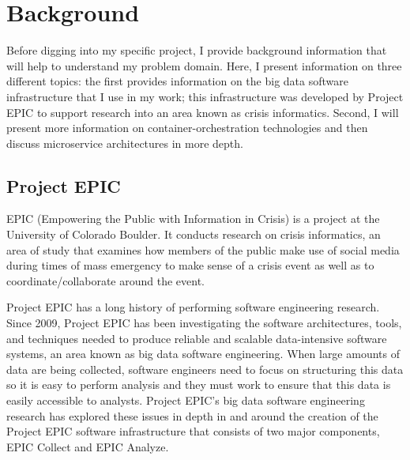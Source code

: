 
\chapter{Background} %

\label{Chapter2} %


Before digging into my specific project, I provide background information that will help to understand my problem domain. Here, I present information on three different topics: the first provides information on the big data software infrastructure that I use in my work; this infrastructure was developed by Project EPIC \parencite{icse11,oopsla12,hiccs15} to support research into an area known as crisis informatics.\parencite{palen2009,palen2010} Second, I will present more information on container-orchestration technologies and then discuss microservice architectures in more depth.


\section{Project EPIC}



EPIC (Empowering the Public with Information in Crisis) is a project at the University of Colorado Boulder. It conducts research on crisis informatics, an area of study that examines how members of the public make use of social media during times of mass emergency to make sense of a crisis event as well as to coordinate/collaborate around the event.

Project EPIC has a long history of performing software engineering research. Since 2009, Project EPIC has been investigating the software architectures, tools, and techniques needed to produce reliable and scalable data-intensive software systems, an area known as big data software engineering.\parencite{hiccs15} When large amounts of data are being collected, software engineers need to focus on structuring this data so it is easy to perform analysis and they must work to ensure that this data is easily accessible to analysts. Project EPIC’s big data software engineering research has explored these issues in depth in and around the creation of the Project EPIC software infrastructure that consists of two major components, EPIC Collect and EPIC Analyze.

